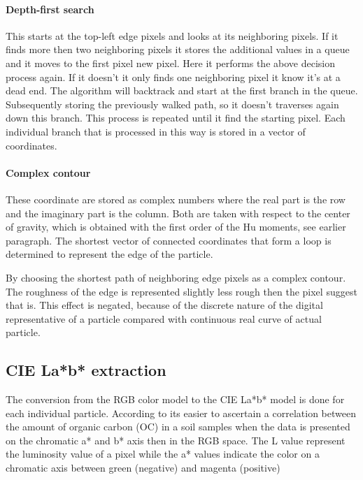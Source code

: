 \documentclass[11pt,fleqn,,a4paper,twoside,openright]{book}
\begin{document}
\paragraph{Depth-first search}\label{Depth-first search}
This starts at the top-left edge pixels and looks at its neighboring pixels. If it finds more then two neighboring pixels it stores the additional values in a queue and it moves to the first pixel new pixel. Here it performs the above decision process again. If it doesn't it only finds one neighboring pixel it know it's at a dead end. The algorithm will backtrack and start at the first branch in the queue. Subsequently storing the previously walked path, so it doesn't traverses again down this branch. This process is repeated until it find the starting pixel. Each individual branch that is processed in this way is stored in a vector of coordinates.

\paragraph{Complex contour}\label{Complex contour}
These coordinate are stored as complex numbers where the real part is the row and the imaginary part is the column. Both are taken with respect to the center of gravity, which is obtained with the first order of the Hu moments, see earlier paragraph.
The shortest vector of connected coordinates that form a loop is determined to represent the edge of the particle.

\begin{remark}
	By choosing the shortest path of neighboring edge pixels as a complex contour. The roughness of the edge is represented slightly less rough then the pixel suggest that is. This effect is negated, because of the discrete nature of the digital representative of a particle compared with continuous real curve of actual particle.
\end{remark}

\subsection{CIE La*b* extraction}\label{CIELab}
The conversion from the RGB color model to the CIE La*b* model is done for each individual particle. According to \citeauthor{Spijker14a} \cite{Spijker14a} its easier to ascertain a correlation between the amount of organic carbon (OC) in a soil samples when the data is presented on the chromatic a* and b* axis then in the RGB space. The L value represent the luminosity value of a pixel while the a* values indicate the color on a chromatic axis between green (negative) and magenta (positive)
\end{document}
